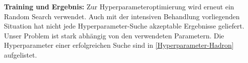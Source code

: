 \textbf{Training und Ergebnis:} Zur Hyperparameteroptimierung wird erneut ein Random Search verwendet. Auch mit der intensiven Behandlung vorliegenden Situation hat nicht jede Hyperparameter-Suche akzeptable Ergebnisse geliefert. Unser Problem ist stark abhängig von den verwendeten Parametern. %
Die Hyperparameter einer erfolgreichen Suche sind in \textsf{\autoref{Hyperparameter-Hadron}} aufgelistet. 
\begin{figure}[tbp]
	\centering
	 \\

\end{figure}
